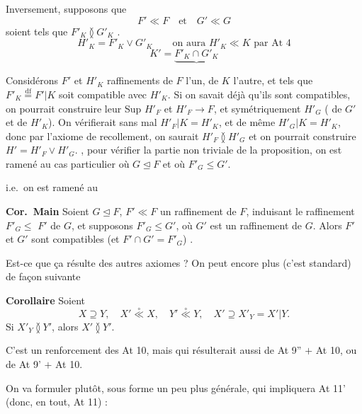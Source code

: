 \documentclass[11pt,a4paper]{article}
\begin{document}
Inversement, supposons que
\[
  F' \ll F \quad \text{et} \quad G' \ll G
\]
soient tels que $F'_K \between G'_K$ .
\[
  H'_K = F'_K \vee G'_K \qquad \text{on aura } H'_K \ll K \text{ par At 4}
\]
\[
  K' = \underbrace{F'_K \cap G'_K}
\]
\struck{\ill{}}

Considérons $F'$ et $H'_K$  raffinements de $F$ l'un, de $K$ l'autre, et tels que $F'_K \overset{\mathrm{df}}{=} F'|K$ soit compatible avec $H'_K$. Si on savait déjà qu'ils sont compatibles, on pourrait construire leur  Sup $H'_F$ et $H'_F \to F$, et symétriquement $H'_G$ ( de $G'$ et de $H'_K$). On vérifierait sans mal $H'_F | K = H'_K$, et de même $H'_G | K = H'_K$, donc par l'axiome de recollement, on saurait $H'_F \between H'_G$ et on pourrait construire $H' = H'_F \vee H'_G$.  , pour vérifier la partie non triviale de la proposition, on est ramené au cas particulier où $G \trianglelefteq F$ et où $F'_G \leq G'$.

i.e.\ on est ramené au

\textbf{Cor.\ Main} Soient $G \trianglelefteq F$, $F' \ll F$ un raffinement de $F$, induisant le raffinement $F'_G \leq$ \struck{$\ll$} $F'$ de $G$, et  supposons $F'_G \leq G'$, où $G'$ est un raffinement de $G$. Alors  $F'$ et $G'$ sont compatibles (et $F' \cap G' = F'_G$) \struck{\ill{}}.

Est-ce que ça résulte des autres axiomes ?  On peut encore  plus (c'est standard) de façon \ill{} suivante

 \textbf{Corollaire}  Soient
\[
  X \supseteq Y, \quad X' \overset{\circ}{\ll} X, \quad Y' \overset{\circ}{\ll} Y, \quad X' \supseteq X'_Y = X'|Y .
\]
Si $X'_Y \between Y'$, alors $X' \between Y'$.

C'est un renforcement  \ill{} \ill{} des At 10, mais qui résulterait aussi de At 9'' $+$ At 10, ou de At 9' $+$ At 10.

On va formuler plutôt, sous forme un peu plus générale, qui \ill{} impliquera  At 11' (donc, en tout,  At 11) :
\end{document}
